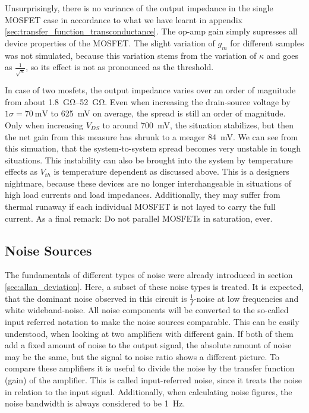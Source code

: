 Unsurprisingly, there is no variance of the output impedance in the single MOSFET case in accordance to what we have learnt in appendix \ref{sec:transfer_function_transconductance}. The op-amp gain simply supresses all device properties of the MOSFET. The slight variation of $g_m$ for different samples was not simulated, because this variation stems from the variation of $\kappa$ and goes as $\frac{1}{\sqrt{\kappa}}$, so its effect is not as pronounced as the threshold.

In case of two mosfets, the output impedance varies over an order of magnitude from about \qtyrange[range-units = single]{1.8}{52}{\giga \ohm}. Even when increasing the drain-source voltage by $1 \sigma = \qty{70}{\mV}$ to \qty{625}{\mV} on average, the spread is still an order of magnitude. Only when increasing $V_{DS}$ to around \qty{700}{\mV}, the situation stabilizes, but then the net gain from this measure has shrunk to a meager \qty{84}{\mV}. We can see from this simuation, that the system-to-system spread becomes very unstable in tough situations. This instability can also be brought into the system by temperature effects as $V_{th}$ is temperature dependent as discussed above. This is a designers nightmare, because these devices are no longer interchangeable in situations of high load currents and load impedances. Additionally, they may suffer from thermal runaway if each individual MOSFET is not layed to carry the full current. As a final remark: Do not parallel MOSFETs in saturation, ever.

\clearpage
\subsection{Noise Sources}
\label{sec:current_source_noise}
The fundamentals of different types of noise were already introduced in section \ref{sec:allan_deviation}. Here, a subset of these noise types is treated. It is expected, that the dominant noise observed in this circuit is $\frac{1}{f}$-noise at low frequencies and white wideband-noise. All noise components will be converted to the so-called input referred notation to make the noise sources comparable. This can be easily understood, when looking at two amplifiers with different gain. If both of them add a fixed amount of noise to the output signal, the absolute amount of noise may be the same, but the signal to noise ratio shows a different picture. To compare these amplifiers it is useful to divide the noise by the transfer function (gain) of the amplifier. This is called input-referred noise, since it treats the noise in relation to the input signal. Additionally, when calculating noise figures, the noise bandwidth is always considered to be \qty{1}{\Hz}.

